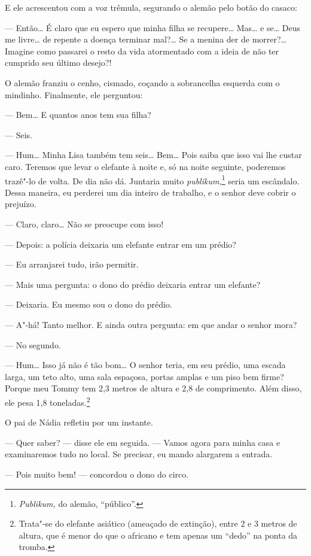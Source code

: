 E ele acrescentou com a voz trêmula, segurando o alemão pelo botão do
casaco:

--- Então\ldots{} É claro que eu espero que minha filha se recupere\ldots{}
Mas\ldots{} e se\ldots{} Deus me livre\ldots{} de repente a doença terminar mal?\ldots{} Se
a menina der de morrer?\ldots{} Imagine como passarei o resto da vida
atormentado com a ideia de não ter cumprido seu último desejo?!

O alemão franziu o cenho, cismado, coçando a sobrancelha esquerda com o
mindinho. Finalmente, ele perguntou:

--- Bem\ldots{} E quantos anos tem sua filha?

--- Seis.

--- Hum\ldots{} Minha Lisa também tem seis\ldots{} Bem\ldots{} Pois saiba que isso vai
lhe custar caro. Teremos que levar o elefante à noite e, só na noite
seguinte, poderemos trazê"-lo de volta. De dia não dá. Juntaria muito
\emph{publikum,}\footnote{\emph{Publikum,} do alemão, ``público''.}
seria um escândalo. Dessa maneira, eu perderei um dia inteiro de
trabalho, e o senhor deve cobrir o prejuízo.

--- Claro, claro\ldots{} Não se preocupe com isso!

--- Depois: a polícia deixaria um elefante entrar em um prédio?

--- Eu arranjarei tudo, irão permitir.

--- Mais uma pergunta: o dono do prédio deixaria entrar um elefante?

--- Deixaria. Eu mesmo sou o dono do prédio.

--- A"-há! Tanto melhor. E ainda outra pergunta: em que andar o senhor
mora?

--- No segundo.

--- Hum\ldots{} Isso já não é tão bom\ldots{} O senhor teria, em seu prédio, uma
escada larga, um teto alto, uma sala espaçosa, portas amplas e um piso
bem firme? Porque meu Tommy tem 2,3 metros de altura e 2,8 de
comprimento. Além disso, ele pesa 1,8 toneladas.\footnote{Trata"-se
  do elefante asiático (ameaçado de extinção), entre 2 e 3 metros de
  altura, que é menor do que o africano e tem apenas um ``dedo'' na
  ponta da tromba.}

O pai de Nádia refletiu por um instante.

--- Quer saber? --- disse ele em seguida. --- Vamos agora para minha
casa e examinaremos tudo no local. Se precisar, eu mando alargarem a
entrada.

--- Pois muito bem! --- concordou o dono do circo.

